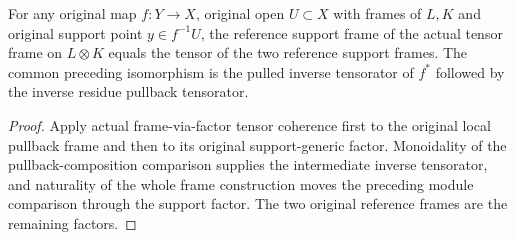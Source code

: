 \begin{lemma}
\label{lem:native-tc-nef-fs-reference-support-tensor-frame}
\leanok
{}
For any original map $f:Y\to X$, original open $U\subset X$ with frames
of $L,K$ and original support point $y\in f^{-1}U$, the reference support
frame of the actual tensor frame on $L\otimes K$ equals the tensor of
the two reference support frames.  The common preceding isomorphism is
the pulled inverse tensorator of $f^*$ followed by the inverse residue
pullback tensorator.
\end{lemma}
\begin{proof}
Apply actual frame-via-factor tensor coherence first to the original
local pullback frame and then to its original support-generic factor.
Monoidality of the pullback-composition comparison supplies the
intermediate inverse tensorator, and naturality of the whole frame
construction moves the preceding module comparison through the support
factor.  The two original reference frames are the remaining factors.
\end{proof}
